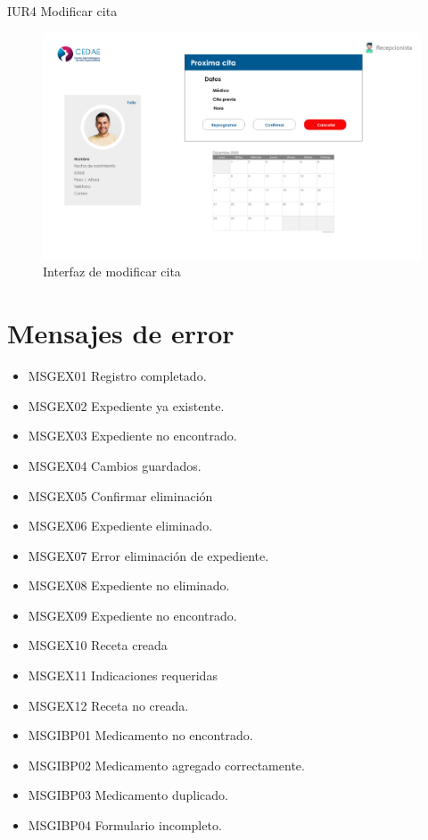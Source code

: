\documentclass[12pt,letterpaper]{article}
\begin{document}
        IUR4 Modificar cita
            \begin{figure}[H]
                \centering
                \includegraphics [scale=0.18]{interfaces/rec_modificar_cita}
                \caption{Interfaz de modificar cita}
            \end{figure}
            
        \newpage
        \section{Mensajes de error}
            \begin{itemize}
                \item MSGEX01 Registro completado.
                \item MSGEX02 Expediente ya existente.
                \item MSGEX03 Expediente no encontrado.
                \item MSGEX04 Cambios guardados.
                \item MSGEX05 Confirmar eliminación
                \item MSGEX06 Expediente eliminado.
                \item MSGEX07 Error eliminación de expediente.
                \item MSGEX08 Expediente no eliminado.
                \item MSGEX09 Expediente no encontrado.
                \item MSGEX10 Receta creada
                \item MSGEX11 Indicaciones requeridas
                \item MSGEX12 Receta no creada.
                \item MSGIBP01 Medicamento no encontrado.
                \item MSGIBP02 Medicamento agregado correctamente.
                \item MSGIBP03 Medicamento duplicado.
                \item MSGIBP04 Formulario incompleto.
            \end{itemize}
\end{document}
